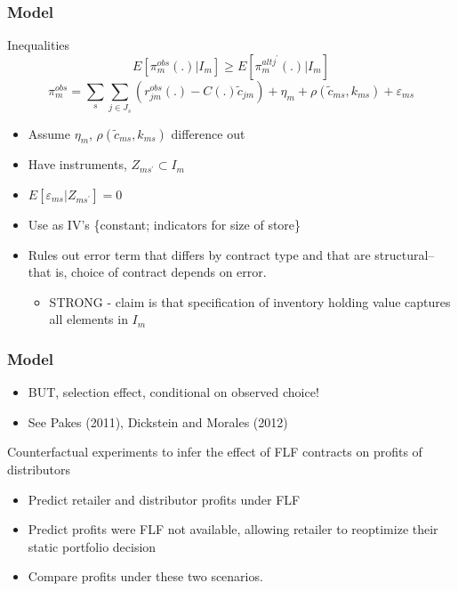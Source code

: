 \documentclass[notes=show]{beamer}
\begin{document}
\begin{frame}
\frametitle{Model}

Inequalities%
\[
E[\pi _{m}^{obs}(.)|I_{m}] \geq E[\pi _{m}^{altj^{\prime }}(.)|I_{m}] 
\]
\[
\pi _{m}^{obs} =\sum_{s}\sum_{j\in J_{s}}(r_{jm}^{obs}(.)-C(.)\widetilde{c}_{jm})+\eta _{m}+\rho (\widetilde{c}_{ms},k_{ms})+\varepsilon _{ms}
\]

\begin{itemize}
\item Assume $\eta _{m}$, $\rho (\widetilde{c}_{ms},k_{ms})$ difference out

\item Have instruments, $Z_{ms^{\prime }}\subset I_{m}$

\item $E[\varepsilon _{ms}|Z_{ms^{\prime }}]=0$

\item Use as IV's \{constant; indicators for size of store\}

\item Rules out error term that differs by contract type and that are
structural--that is, choice of contract depends on error.

\begin{itemize}
\item STRONG - claim is that specification of inventory holding value
captures all elements in $I_{m}$
\end{itemize}
\end{itemize}
\end{frame}


\begin{frame}
\frametitle{Model}

\begin{itemize}
\item BUT, selection effect, conditional on observed choice!

\item See Pakes (2011), Dickstein and Morales (2012)
\end{itemize}

Counterfactual experiments to infer the effect of FLF contracts on profits
of distributors

\begin{itemize}
\item Predict retailer and distributor profits under FLF

\item Predict profits were FLF not available, allowing retailer to
reoptimize their static portfolio decision

\item Compare profits under these two scenarios.
\end{itemize}
\end{frame}
\end{document}
